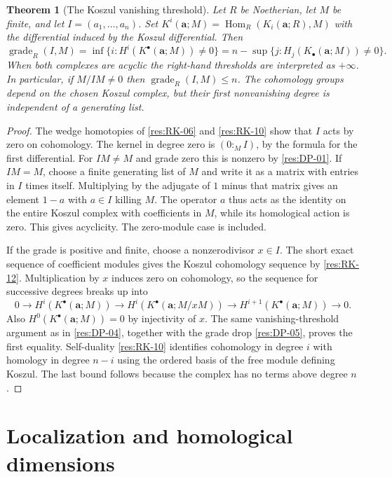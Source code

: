 \documentclass[11pt,oneside,openany]{book}
\newtheorem{theorem}{Theorem}[chapter]
\theoremstyle{definition}
\theoremstyle{remark}
\begin{document}
\begin{theorem}[The Koszul vanishing threshold]\label{res:DP-09}
Let $R$ be Noetherian, let $M$ be finite, and let
$I=(a_1,\ldots,a_n)$. Set
$K^i(\mathbf a;M)=\operatorname{Hom}_R(K_i(\mathbf a;R),M)$
with the differential induced by the Koszul differential.
Then
\[
 \operatorname{grade}_R(I,M)
  =\inf\{i:H^i(K^\bullet(\mathbf a;M))\ne0\}
  =n-\sup\{j:H_j(K_\bullet(\mathbf a;M))\ne0\}.
\]
When both complexes are acyclic the right-hand thresholds are
interpreted as $+\infty$. In particular, if $M/IM\ne0$ then
$\operatorname{grade}_R(I,M)\le n$. The cohomology groups depend on
the chosen Koszul complex, but their first nonvanishing degree
is independent of a generating list.
\end{theorem}
\begin{proof}
The wedge homotopies of \ref{res:RK-06} and \ref{res:RK-10}
show that $I$ acts by zero on cohomology. The kernel in degree zero
is $(0:_M I)$, by the formula for the first differential.
For $IM\ne M$ and grade zero this is nonzero by \ref{res:DP-01}.
If $IM=M$, choose a finite generating list of $M$ and write it as
a matrix with entries in $I$ times itself. Multiplying by the
adjugate of $1$ minus that matrix gives an element $1-a$ with
$a\in I$ killing $M$. The operator $a$ thus acts as the identity
on the entire Koszul complex with coefficients in $M$, while its
homological action is zero. This gives acyclicity. The zero-module
case is included.

If the grade is positive and finite, choose a nonzerodivisor $x\in I$.
The short exact sequence of coefficient modules gives the Koszul
cohomology sequence by \ref{res:RK-12}. Multiplication by $x$
induces zero on cohomology, so the sequence for successive degrees
breaks up into
\[
 0\to H^i(K^\bullet(\mathbf a;M))\to
 H^i(K^\bullet(\mathbf a;M/xM))\to
 H^{i+1}(K^\bullet(\mathbf a;M))\to0 .
\]
Also $H^0(K^\bullet(\mathbf a;M))=0$ by injectivity of $x$.
The same vanishing-threshold argument as in \ref{res:DP-04},
together with the grade drop \ref{res:DP-05}, proves the first
equality. Self-duality \ref{res:RK-10} identifies cohomology in
degree $i$ with homology in degree $n-i$ using the ordered basis
of the free module defining Koszul. The last bound follows because
the complex has no terms above degree $n$.
\end{proof}

\section{Localization and homological dimensions}
\end{document}
